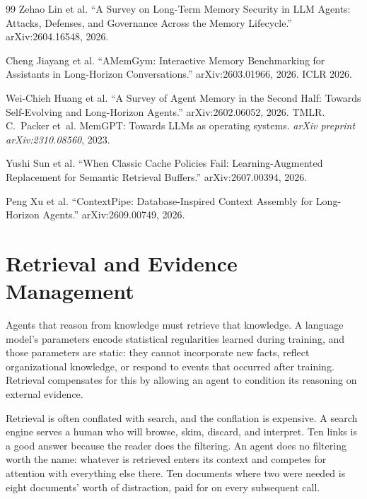 \documentclass[11pt]{book}
\begin{document}
\begin{thebibliography}{99}
Zehao Lin et al.
``A Survey on Long-Term Memory Security in LLM Agents: Attacks, Defenses, and Governance Across the Memory Lifecycle.''
arXiv:2604.16548, 2026.

Cheng Jiayang et al.
``AMemGym: Interactive Memory Benchmarking for Assistants in Long-Horizon Conversations.''
arXiv:2603.01966, 2026. ICLR 2026.

Wei-Chieh Huang et al.
``A Survey of Agent Memory in the Second Half: Towards Self-Evolving and Long-Horizon Agents.''
arXiv:2602.06052, 2026. TMLR.
C.~Packer et~al.
\newblock MemGPT: Towards LLMs as operating systems.
\newblock \emph{arXiv preprint arXiv:2310.08560}, 2023.


Yushi Sun et al.
``When Classic Cache Policies Fail: Learning-Augmented Replacement for Semantic Retrieval Buffers.''
arXiv:2607.00394, 2026.

Peng Xu et al.
``ContextPipe: Database-Inspired Context Assembly for Long-Horizon Agents.''
arXiv:2609.00749, 2026.
\end{thebibliography}

\chapter{Retrieval and Evidence Management}
\label{ch:retrieval}

Agents that reason from knowledge must retrieve that knowledge. A language model's parameters encode statistical regularities learned during training, and those parameters are static: they cannot incorporate new facts, reflect organizational knowledge, or respond to events that occurred after training. Retrieval compensates for this by allowing an agent to condition its reasoning on external evidence.

Retrieval is often conflated with search, and the conflation is expensive. A search engine serves a human who will browse, skim, discard, and interpret. Ten links is a good answer because the reader does the filtering. An agent does no filtering worth the name: whatever is retrieved enters its context and competes for attention with everything else there. Ten documents where two were needed is eight documents' worth of distraction, paid for on every subsequent call.
\end{document}
